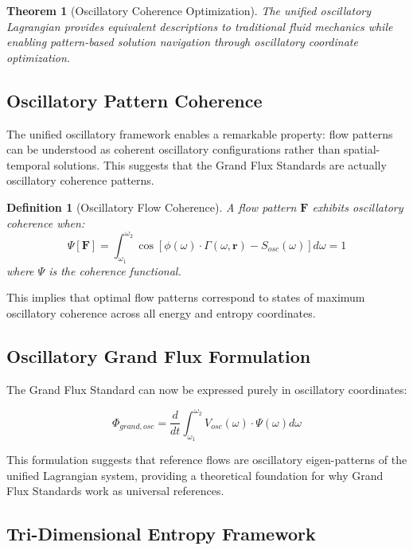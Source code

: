 \documentclass[12pt,a4paper]{article}
\newtheorem{theorem}{Theorem}
\newtheorem{definition}{Definition}
\begin{document}
\begin{theorem}[Oscillatory Coherence Optimization]
The unified oscillatory Lagrangian provides equivalent descriptions to traditional fluid mechanics while enabling pattern-based solution navigation through oscillatory coordinate optimization.
\end{theorem}

\subsection{Oscillatory Pattern Coherence}

The unified oscillatory framework enables a remarkable property: flow patterns can be understood as coherent oscillatory configurations rather than spatial-temporal solutions. This suggests that the Grand Flux Standards are actually oscillatory coherence patterns.

\begin{definition}[Oscillatory Flow Coherence]
A flow pattern $\mathbf{F}$ exhibits oscillatory coherence when:
\begin{equation}
\Psi[\mathbf{F}] = \int_{\omega_1}^{\omega_2} \cos[\phi(\omega) \cdot \Gamma(\omega, \mathbf{r}) - S_{osc}(\omega)] d\omega = 1
\end{equation}
where $\Psi$ is the coherence functional.
\end{definition}

This implies that optimal flow patterns correspond to states of maximum oscillatory coherence across all energy and entropy coordinates.

\subsection{Oscillatory Grand Flux Formulation}

The Grand Flux Standard can now be expressed purely in oscillatory coordinates:

\begin{equation}
\Phi_{grand,osc} = \frac{d}{dt}\int_{\omega_1}^{\omega_2} V_{osc}(\omega) \cdot \Psi(\omega) d\omega
\end{equation}

This formulation suggests that reference flows are oscillatory eigen-patterns of the unified Lagrangian system, providing a theoretical foundation for why Grand Flux Standards work as universal references.

\subsection{Tri-Dimensional Entropy Framework}
\end{document}
